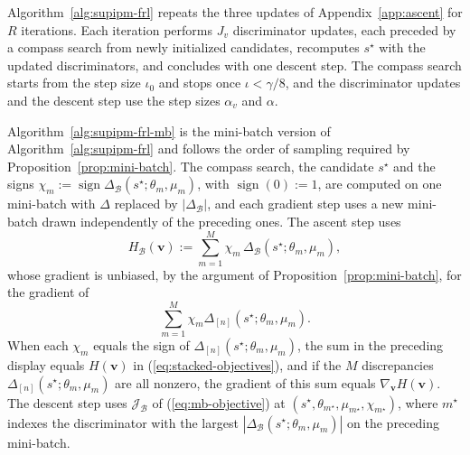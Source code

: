 \documentclass{article} %
\begin{document}
Algorithm~\ref{alg:supipm-frl} repeats the three updates of Appendix~\ref{app:ascent} for $R$ iterations.  Each iteration performs $J_v$ discriminator updates, each preceded by a compass search from newly initialized candidates, recomputes $s^{\star}$ with the updated discriminators, and concludes with one descent step.  The compass search starts from the step size $\iota_0$ and stops once $\iota<\gamma/8$, and the discriminator updates and the descent step use the step sizes $\alpha_v$ and $\alpha$.

Algorithm~\ref{alg:supipm-frl-mb} is the mini-batch version of Algorithm~\ref{alg:supipm-frl} and follows the order of sampling required by Proposition~\ref{prop:mini-batch}.  The compass search, the candidate $s^{\star}$ and the signs $\chi_m:=\operatorname{sign}\Delta_{\mathcal{B}}(s^{\star};\theta_m,\mu_m)$, with $\operatorname{sign}(0):=1$, are computed on one mini-batch with $\Delta$ replaced by $|\Delta_{\mathcal{B}}|$, and each gradient step uses a new mini-batch drawn independently of the preceding ones.  The ascent step uses
\begin{equation}
  H_{\mathcal{B}}(\mathbf{v})
  :=\sum_{m=1}^{M}\chi_m\,\Delta_{\mathcal{B}}(s^{\star};\theta_m,\mu_m),
  \label{eq:mb-stacked-ascent}
\end{equation}
whose gradient is unbiased, by the argument of Proposition~\ref{prop:mini-batch}, for the gradient of
\[
  \sum_{m=1}^{M}\chi_m\Delta_{[n]}(s^{\star};\theta_m,\mu_m).
\]
When each $\chi_m$ equals the sign of $\Delta_{[n]}(s^{\star};\theta_m,\mu_m)$, the sum in the preceding display equals $H(\mathbf{v})$ in (\ref{eq:stacked-objectives}), and if the $M$ discrepancies $\Delta_{[n]}(s^{\star};\theta_m,\mu_m)$ are all nonzero, the gradient of this sum equals $\nabla_{\mathbf{v}}H(\mathbf{v})$.
The descent step uses $\mathcal{J}_{\mathcal{B}}$ of (\ref{eq:mb-objective}) at $(s^{\star},\theta_{m^{\star}},\mu_{m^{\star}},\chi_{m^{\star}})$, where $m^{\star}$ indexes the discriminator with the largest $|\Delta_{\mathcal{B}}(s^{\star};\theta_m,\mu_m)|$ on the preceding mini-batch.
\end{document}
